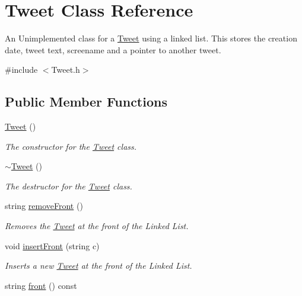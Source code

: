 \hypertarget{class_tweet}{}\section{Tweet Class Reference}
\label{class_tweet}


An Unimplemented class for a \hyperlink{class_tweet}{Tweet} using a linked list. This stores the creation date, tweet text, screename and a pointer to another tweet.  




{\ttfamily \#include $<$Tweet.\+h$>$}

\subsection*{Public Member Functions}
\begin{DoxyCompactItemize}
\item 
\hypertarget{class_tweet_a44199f9f1acd3f2dcd290f09e2f334c6}{}\hyperlink{class_tweet_a44199f9f1acd3f2dcd290f09e2f334c6}{Tweet} ()\label{class_tweet_a44199f9f1acd3f2dcd290f09e2f334c6}

\begin{DoxyCompactList}\small\item\em The constructor for the \hyperlink{class_tweet}{Tweet} class. \end{DoxyCompactList}\item 
\hypertarget{class_tweet_a81d6643e4ee5616281339d2918ca415b}{}\hyperlink{class_tweet_a81d6643e4ee5616281339d2918ca415b}{$\sim$\+Tweet} ()\label{class_tweet_a81d6643e4ee5616281339d2918ca415b}

\begin{DoxyCompactList}\small\item\em The destructor for the \hyperlink{class_tweet}{Tweet} class. \end{DoxyCompactList}\item 
\hypertarget{class_tweet_a0a2ab2c4dee7c6b6c16bfe7f052ab539}{}string \hyperlink{class_tweet_a0a2ab2c4dee7c6b6c16bfe7f052ab539}{remove\+Front} ()\label{class_tweet_a0a2ab2c4dee7c6b6c16bfe7f052ab539}

\begin{DoxyCompactList}\small\item\em Removes the \hyperlink{class_tweet}{Tweet} at the front of the Linked List. \end{DoxyCompactList}\item 
void \hyperlink{class_tweet_a00f6f31c8cbd05608fb646316bdebea3}{insert\+Front} (string c)
\begin{DoxyCompactList}\small\item\em Inserts a new \hyperlink{class_tweet}{Tweet} at the front of the Linked List. \end{DoxyCompactList}\item 
\hypertarget{class_tweet_ac6463ebca010e697140e84076d263614}{}string \hyperlink{class_tweet_ac6463ebca010e697140e84076d263614}{front} () const \label{class_tweet_ac6463ebca010e697140e84076d263614}


\end{DoxyCompactItemize}
